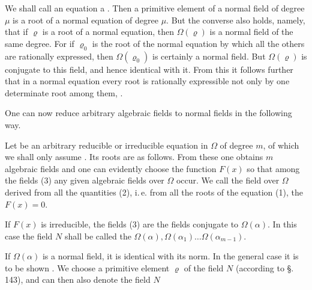 
We shall call an equation a . Then a primitive element of a normal field of degree $\mu$ is a root of a normal equation of degree $\mu$. But the converse also holds, namely, that if $\varrho$ is a root of a normal equation, then $\Omega(\varrho)$ is a normal field of the same degree. For if $\varrho_0$ is the root of the normal equation by which all the others are rationally expressed, then $\Omega(\varrho_0)$ is certainly a normal field. But $\Omega(\varrho)$ is conjugate to this field, and hence identical with it. From this it follows further that in a normal equation every root is rationally expressible not only by one determinate root among them, .

One can now reduce arbitrary algebraic fields to normal fields in the following way.

Let
be an arbitrary reducible or irreducible equation in $\Omega$ of degree $m$, of which we shall only assume . Its roots are as follows.
From these one obtains $m$ algebraic fields
and one can evidently choose the function $F(x)$ so that among the fields (3) any given algebraic fields over $\Omega$ occur. We call the field over $\Omega$ derived from all the quantities (2), i.\,e. from all the roots of the equation (1),
the  $F(x) = 0$.

If $F(x)$ is irreducible, the fields (3) are the fields conjugate to $\Omega(\alpha)$. In this case the field $N$ shall be called the  $\Omega(\alpha), \Omega(\alpha_1) \ldots \Omega(\alpha_{m-1})$.

If $\Omega(\alpha)$ is a normal field, it is identical with its norm. In the general case it is to be shown . We choose a primitive element $\varrho$ of the field $N$ (according to \S.\,143), and can then also denote the field $N$
